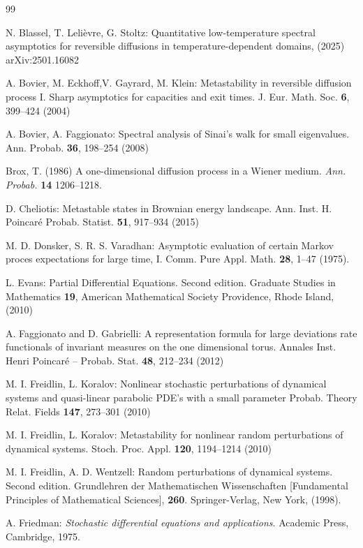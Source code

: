 \documentclass[reqno]{amsart}
\theoremstyle{plain}
\theoremstyle{definition}
\newcounter{as}[section]
\newcommand{\<}{\langle}
\renewcommand{\>}{\rangle}
\begin{document}
\begin{thebibliography}{99}

 N. Blassel, T.  Leli{\`e}vre, G. Stoltz: Quantitative
low-temperature spectral asymptotics for reversible diffusions in
temperature-dependent domains, (2025) arXiv:2501.16082

 A. Bovier, M. Eckhoff,V. Gayrard, M. Klein: Metastability
in reversible diffusion process I. Sharp asymptotics for capacities
and exit times. J. Eur. Math. Soc. \textbf{6}, 399--424 (2004)

 A. Bovier, A. Faggionato: Spectral analysis of Sinai's
walk for small eigenvalues.  Ann. Probab. {\bf 36}, 198--254 (2008)

 Brox, T. (1986) A one-dimensional diffusion process
in a Wiener medium. {\it Ann. Probab.} {\bf 14} 1206--1218.

 D. Cheliotis: Metastable states in Brownian energy
landscape. Ann. Inst. H. Poincaré Probab. Statist. {\bf 51}, 917--934
(2015)

 M. D. Donsker, S. R. S. Varadhan: Asymptotic evaluation
of certain Markov proces expectations for large time, I. Comm. Pure
Appl. Math. {\bf 28}, 1--47 (1975).

 L. Evans: Partial Differential Equations. Second
edition. Graduate Studies in Mathematics {\bf 19}, American
Mathematical Society Providence, Rhode Island, (2010)

 A. Faggionato and D. Gabrielli: A representation formula
for large deviations rate functionals of invariant measures on the one
dimensional torus. Annales Inst. Henri Poincar\'e -- Probab. Stat.
{\bf 48}, 212--234 (2012)

 M. I. Freidlin, L. Koralov: Nonlinear stochastic
perturbations of dynamical systems and quasi-linear parabolic PDE's
with a small parameter Probab. Theory Relat. Fields \textbf{147},
273--301 (2010)

 M. I. Freidlin, L. Koralov: Metastability for nonlinear
random perturbations of dynamical systems. Stoch. Proc. Appl. \textbf{120},
1194--1214 (2010)

 M. I. Freidlin, A. D. Wentzell: Random perturbations of
dynamical systems. Second edition.  Grundlehren der Mathematischen
Wissenschaften [Fundamental Principles of Mathematical Sciences], {\bf
260}. Springer-Verlag, New York, (1998).

 A. Friedman: \textit{Stochastic differential equations
and applications}. Academic Press, Cambridge, 1975.


\end{thebibliography}
\end{document}
